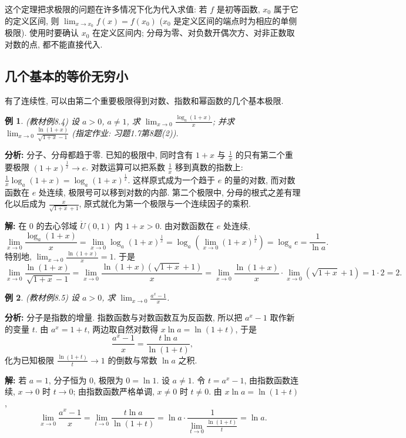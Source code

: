 \documentclass[UTF8,openany]{ctexbook}
\theoremstyle{chinesetextbook}
\newtheorem{example}{例}[section]
\newenvironment{cnsolution}{\par\indent\textbf{解:} \ignorespaces}{\par}
\begin{document}
这个定理把求极限的问题在许多情况下化为代入求值: 若 $f$ 是初等函数, $x_0$ 属于它的定义区间, 则 $\displaystyle\lim_{x\to x_0}f(x)=f(x_0)$ ($x_0$ 是定义区间的端点时为相应的单侧极限). 使用时要确认 $x_0$ 在定义区间内; 分母为零、对负数开偶次方、对非正数取对数的点, 都不能直接代入.
\subsection{几个基本的等价无穷小}
有了连续性, 可以由第二个重要极限得到对数、指数和幂函数的几个基本极限.
\begin{example}\label{ex:8-4}
\textnormal{(教材例8.4)} 设 $a>0$, $a\ne1$, 求 $\displaystyle\lim_{x\to0}\frac{\log_a(1+x)}x$; 并求 $\displaystyle\lim_{x\to0}\frac{\ln(1+x)}{\sqrt{1+x}-1}$ (指定作业: 习题1.7第8题(2)).
\end{example}
\par\indent\textbf{分析:} 分子、分母都趋于零. 已知的极限中, 同时含有 $1+x$ 与 $\displaystyle\frac1x$ 的只有第二个重要极限 $(1+x)^{\frac1x}\to e$. 对数运算可以把系数 $\displaystyle\frac1x$ 移到真数的指数上: $\displaystyle\frac1x\log_a(1+x)=\log_a(1+x)^{\frac1x}$. 这样原式成为一个趋于 $e$ 的量的对数, 而对数函数在 $e$ 处连续, 极限号可以移到对数的内部. 第二个极限中, 分母的根式之差有理化以后成为 $\displaystyle\frac x{\sqrt{1+x}+1}$, 原式就化为第一个极限与一个连续因子的乘积.
\begin{cnsolution}
在 $0$ 的去心邻域 $\mathring U(0,1)$ 内 $1+x>0$. 由对数函数在 $e$ 处连续,
\[
\lim_{x\to0}\frac{\log_a(1+x)}x=\lim_{x\to0}\log_a(1+x)^{\frac1x}=\log_a\left(\lim_{x\to0}(1+x)^{\frac1x}\right)=\log_ae=\frac1{\ln a}.
\]
特别地, $\displaystyle\lim_{x\to0}\frac{\ln(1+x)}x=1$. 于是
\[
\lim_{x\to0}\frac{\ln(1+x)}{\sqrt{1+x}-1}=\lim_{x\to0}\frac{\ln(1+x)\left(\sqrt{1+x}+1\right)}x=\lim_{x\to0}\frac{\ln(1+x)}x\cdot\lim_{x\to0}\left(\sqrt{1+x}+1\right)=1\cdot2=2.
\]
\end{cnsolution}
\begin{example}\label{ex:8-5}
\textnormal{(教材例8.5)} 设 $a>0$, 求 $\displaystyle\lim_{x\to0}\frac{a^x-1}x$.
\end{example}
\par\indent\textbf{分析:} 分子是指数的增量. 指数函数与对数函数互为反函数, 所以把 $a^x-1$ 取作新的变量 $t$. 由 $a^x=1+t$, 两边取自然对数得 $x\ln a=\ln(1+t)$, 于是
\[
\frac{a^x-1}x=\frac{t\ln a}{\ln(1+t)},
\]
化为已知极限 $\displaystyle\frac{\ln(1+t)}t\to1$ 的倒数与常数 $\ln a$ 之积.
\begin{cnsolution}
若 $a=1$, 分子恒为 $0$, 极限为 $0=\ln1$. 设 $a\ne1$. 令 $t=a^x-1$, 由指数函数连续, $x\to0$ 时 $t\to0$; 由指数函数严格单调, $x\ne0$ 时 $t\ne0$. 由 $x\ln a=\ln(1+t)$,
\[
\lim_{x\to0}\frac{a^x-1}x=\lim_{t\to0}\frac{t\ln a}{\ln(1+t)}=\ln a\cdot\frac1{\displaystyle\lim_{t\to0}\frac{\ln(1+t)}t}=\ln a.
\]
\end{cnsolution}
\end{document}
